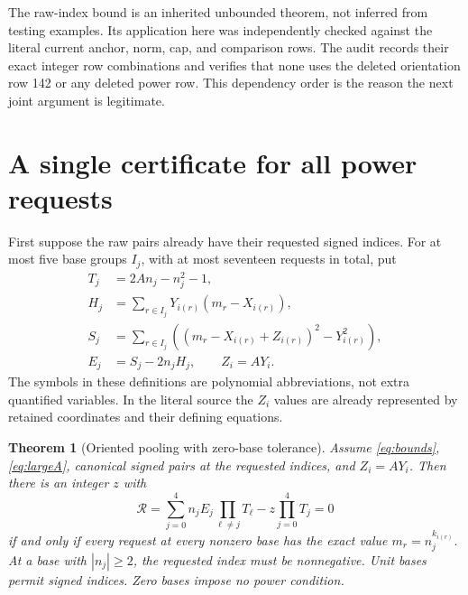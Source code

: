 \documentclass[11pt]{article}
\newtheorem{theorem}{Theorem}[section]
\theoremstyle{definition}\newtheorem{definition}[theorem]{Definition}
\begin{document}
The raw-index bound is an inherited unbounded theorem, not inferred from
testing examples. Its application here was independently checked against
the literal current anchor, norm, cap, and comparison rows. The audit
records their exact integer row combinations and verifies that none uses
the deleted orientation row 142 or any deleted power row. This dependency
order is the reason the next joint argument is legitimate.

\section{A single certificate for all power requests}
\label{sec:powerpool}

First suppose the raw pairs already have their requested signed indices.
For at most five base groups $I_j$, with at most seventeen requests in
total, put
\begin{align}
 T_j&=2An_j-n_j^2-1,\label{eq:T}\\
 H_j&=\sum_{r\in I_j}Y_{i(r)}(m_r-X_{i(r)}),\label{eq:H}\\
 S_j&=\sum_{r\in I_j}\left((m_r-X_{i(r)}+Z_{i(r)})^2-Y_{i(r)}^2\right),\label{eq:S}\\
 E_j&=S_j-2n_jH_j,\qquad Z_i=AY_i.\label{eq:E}
\end{align}
The symbols in these definitions are polynomial abbreviations, not extra
quantified variables. In the literal source the $Z_i$ values are already
represented by retained coordinates and their defining equations.

\begin{theorem}[Oriented pooling with zero-base tolerance]\label{thm:power}
Assume \eqref{eq:bounds}, \eqref{eq:largeA}, canonical signed pairs at
the requested indices, and $Z_i=AY_i$. Then there is an integer $z$ with
\begin{equation}\label{eq:R}
 \mathcal R=
 \sum_{j=0}^4 n_jE_j\prod_{\ell\ne j}T_\ell
       -z\prod_{j=0}^4T_j=0
\end{equation}
if and only if every request at every nonzero base has the exact value
$m_r=n_j^{k_{i(r)}}$. At a base with $|n_j|\ge2$, the requested index must be
nonnegative. Unit bases permit signed indices. Zero bases impose no power
condition.
\end{theorem}
\end{document}
